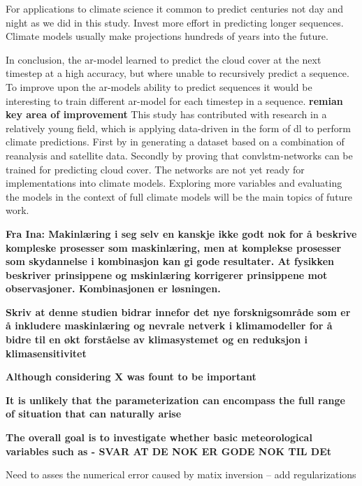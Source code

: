 For applications to climate science it common to predict centuries not day and night as we did in this study. Invest more effort in predicting longer sequences. Climate models usually make projections hundreds of years into the future.

In conclusion, the \acrshort{ar}-model learned to predict the cloud cover at the next timestep at a high accuracy, but where unable to recursively predict a sequence. To improve upon the \acrshort{ar}-models ability to predict sequences it would be interesting to train different \acrshort{ar}-model for each timestep in a sequence. 
\textbf{remian key area of improvement}
This study has contributed with research in a relatively young field, which is applying data-driven in the form of \acrshort{dl} to perform climate predictions. First by in generating a dataset based on a combination of reanalysis and satellite data. Secondly by proving that \acrshort{convlstm}-networks can be trained for predicting cloud cover. The networks are not yet ready for implementations into climate models. Exploring more variables and evaluating the models in the context of full climate models will be the main topics of future work. 


\textbf{Fra Ina: Makinlæring i seg selv en kanskje ikke godt nok for å beskrive kompleske prosesser som maskinlæring, men at komplekse prosesser som skydannelse i kombinasjon kan gi gode resultater. At fysikken beskriver prinsippene og mskinlæring korrigerer prinsippene mot observasjoner. Kombinasjonen er løsningen.}

\textbf{Skriv at denne studien bidrar innefor det nye forsknigsområde som er å inkludere maskinlæring og nevrale netverk i klimamodeller for å bidre til en økt forståelse av klimasystemet og en reduksjon i klimasensitivitet}

\textbf{Although considering X was fount to be important}

\textbf{It is unlikely that the parameterization can encompass the full range of situation that can naturally arise}

\textbf{The overall goal is to investigate whether basic meteorological variables such as - SVAR AT DE NOK ER GODE NOK TIL DEt}



Need to asses the numerical error caused by matix inversion -- add regularizations